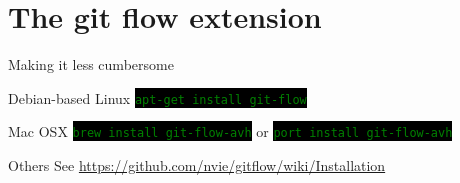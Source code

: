 \documentclass[
14pt,
aspectratio=169,
usenames,
dvipsnames,
x11names]{beamer}
\newcommand{\code}[1]{{\small\colorbox{black}{\textcolor{green}{\texttt{#1}}}}}
\newcommand{\shadowbox}[2]{%
  \hbox{%
    \begin{tcolorbox}[beamer,
      width=#1,
      drop fuzzy shadow=black,
      arc=0pt,
      boxsep=0pt,
      left=0pt,right=0pt,top=0pt,bottom=0pt,
      ]%
      #2
    \end{tcolorbox}
  }
}
\begin{document}

\section{The git flow extension}

\begin{frame}{Making it less cumbersome}
  \begin{exampleblock}{Debian-based Linux}
    \code{apt-get install git-flow}
  \end{exampleblock}
  \begin{exampleblock}{Mac OSX}
    \code{brew install git-flow-avh}
    or
    \code{port install git-flow-avh}
  \end{exampleblock}
  \begin{exampleblock}{Others}
    See \url{https://github.com/nvie/gitflow/wiki/Installation}
  \end{exampleblock}
\end{frame}
\end{document}
